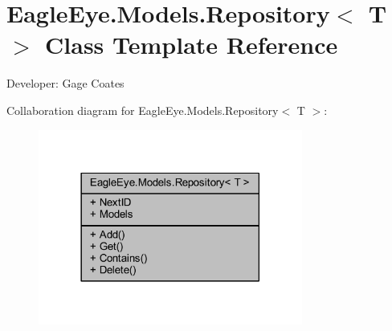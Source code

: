 \hypertarget{class_eagle_eye_1_1_models_1_1_repository}{}\section{Eagle\+Eye.\+Models.\+Repository$<$ T $>$ Class Template Reference}
\label{class_eagle_eye_1_1_models_1_1_repository}


Developer\+: Gage Coates  




Collaboration diagram for Eagle\+Eye.\+Models.\+Repository$<$ T $>$\+:\nopagebreak
\begin{figure}[H]
\begin{center}
\leavevmode
\includegraphics[width=246pt]{class_eagle_eye_1_1_models_1_1_repository__coll__graph}
\end{center}
\end{figure}
